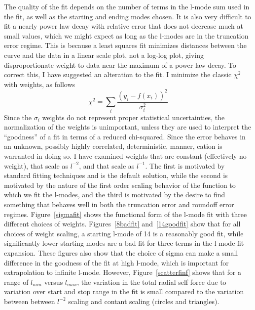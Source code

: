 The quality of the fit depends on the number of terms in the l-mode sum used in the fit, as well as the starting and ending modes chosen. It is also very difficult to fit a nearly power law decay with relative error that does not decrease much at small values, which we might expect as long as the l-modes are in the truncation error regime. This is because a least squares fit minimizes distances between the curve and the data in a linear scale plot, not a log-log plot, giving disproportionate weight to data near the maximum of a power law decay. To correct this, I have suggested an alteration to the fit. I minimize the classic $\chi^2$ with weights, as follows
\begin{equation}
\chi^2=\sum_i \frac{(y_i-f(x_i))^2}{\sigma_i^2}
\end{equation}
Since the $\sigma_i$ weights do not represent proper statistical uncertainties, the normalization of the weights is unimportant, unless they are used to interpret the ``goodness'' of a fit in terms of a reduced chi-squared. Since the error behaves in an unknown, possibly highly correlated, deterministic, manner, cation is warranted in doing so. I have examined weights that are constant (effectively no weight), that  scale as $l^{-2}$, and that scale as $l^{-1}$. The first is motivated by standard fitting techniques and is the default solution, while the second is motivated by the nature of the first order scaling behavior of the function to which we fit the l-modes, and the third is motivated by the desire to find something that behaves well in both the truncation error and roundoff error regimes. Figure~\ref{sigmafit} shows the functional form of the l-mode fit with three different choices of weights. Figures~\ref{8badfit} and~\ref{14goodfit} show that for all choices of weight scaling, a starting l-mode of 14 is a reasonably good fit, while significantly lower starting modes are a bad fit for three terms in the l-mode fit expansion. These figures also show that the choice of sigma can make a small difference in the goodness of the fit at high l-mode, which is important for extrapolation to infinite l-mode. However, Figure~\ref{scatterfinf} shows that for a range of $l_{min}$ versus $l_{max}$, the variation in the total radial self force due to variation over start and stop range in the fit is small compared to the variation between between $l^{-2}$ scaling and contant scaling (circles and triangles). 

